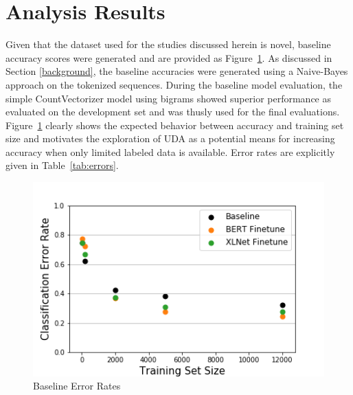\documentclass[twoside,twocolumn,10pt]{article}
\begin{document}

\section{Analysis Results} \label{results}
Given that the dataset used for the studies discussed herein is novel, baseline accuracy scores were generated and are provided as Figure~\ref{fig:baseline}.   As discussed in Section \ref{background}, the baseline accuracies were generated using a Naive-Bayes approach on the tokenized sequences.  During the baseline model evaluation, the simple CountVectorizer model using bigrams showed superior performance as evaluated on the development set and was thusly used for the final evaluations. Figure~\ref{fig:baseline} clearly shows the expected behavior between accuracy and training set size and motivates the exploration of UDA as a potential means for increasing accuracy when only limited labeled data is available.  Error rates are explicitly given in Table~\ref{tab:errors}. 

\begin{figure}
	\includegraphics[width=\linewidth]{baseline.png}
	\caption{Baseline Error Rates}
	\label{fig:baseline}
\end{figure}
\end{document}

